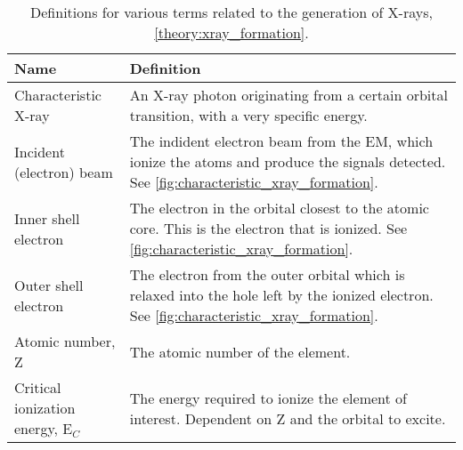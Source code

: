 \begin{table}[phb]
    \begin{center}
        \caption{
            Definitions for various terms related to the generation of X-rays, \cref{theory:xray_formation}.
        }
        \renewcommand*{\arraystretch}{1.4}
        \label{tab:xray_generation}
        \begin{tabular}{p{3cm}p{11.6cm}}
            \hline
            \textbf{Name}                        & \textbf{Definition}                                                                                                                                                                                         \\
            \hline
            Characteristic X-ray                 & An X-ray photon originating from a certain orbital transition, with a very specific energy.                                                                                                                 \\
            Incident (electron) beam             & The indident electron beam from the EM, which ionize the atoms and produce the signals detected. See  \cref{fig:characteristic_xray_formation}.                                                             \\
            Inner shell electron                 & The electron in the orbital closest to the atomic core. This is the electron that is ionized. See  \cref{fig:characteristic_xray_formation}.                                                                \\
            Outer shell electron                 & The electron from the outer orbital which is relaxed into the hole left by the ionized electron. See  \cref{fig:characteristic_xray_formation}.                                                             \\
            Atomic number, Z                     & The atomic number of the element.                                                                                                                                                                           \\
            Critical ionization energy, E$_C$    & The energy required to ionize the element of interest. Dependent on Z and the orbital to excite.                                                                                                            \\

\end{tabular}
\end{center}
\end{table}
